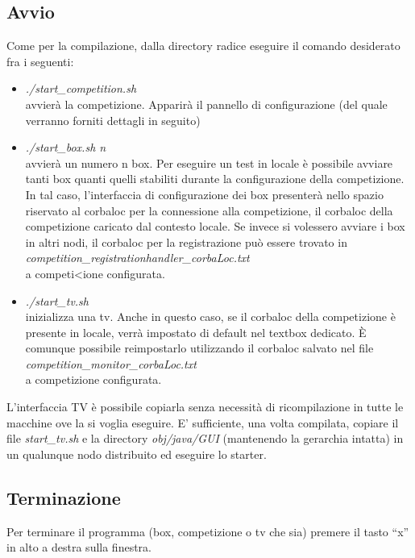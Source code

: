 \subsection{Avvio}
Come per la compilazione, dalla directory radice eseguire il comando desiderato fra i seguenti:
\begin{itemize}
\item \emph{./start\_competition.sh}\\
avvier\`{a} la competizione. Apparir\`{a} il pannello di configurazione (del quale verranno forniti dettagli in seguito)
\item \emph{./start\_box.sh n}\\
avvier\`{a} un numero n box. Per eseguire un test in locale \`{e} possibile avviare tanti box quanti quelli stabiliti durante la configurazione
della competizione. In tal caso, l'interfaccia di configurazione dei box presenter\`{a} nello spazio riservato al corbaloc per la connessione
alla competizione, il corbaloc della competizione caricato dal contesto locale. Se invece si volessero avviare i box in altri nodi, il corbaloc
per la registrazione pu\`{o} essere trovato in \\
\emph{competition\_registrationhandler\_corbaLoc.txt}\\
a competi<ione configurata. 
\item \emph{./start\_tv.sh}\\
inizializza una tv. Anche in questo caso, se il corbaloc della competizione \`{e} presente in locale, verr\`{a} impostato di default nel textbox
dedicato. \`{E} comunque possibile reimpostarlo utilizzando il corbaloc salvato nel file\\
\emph{competition\_monitor\_corbaLoc.txt}\\
a competizione configurata.
\end{itemize}
L'interfaccia TV \`{e} possibile copiarla senza necessit\`{a} di ricompilazione in tutte le macchine ove la si voglia eseguire. E' sufficiente,
una volta compilata, copiare il file \emph{start\_tv.sh} e la directory \emph{obj/java/GUI} (mantenendo la gerarchia intatta) in un qualunque
nodo distribuito ed eseguire lo starter.
\subsection{Terminazione}
Per terminare il programma (box, competizione o tv che sia) premere il tasto ``x'' in alto a destra sulla finestra.

